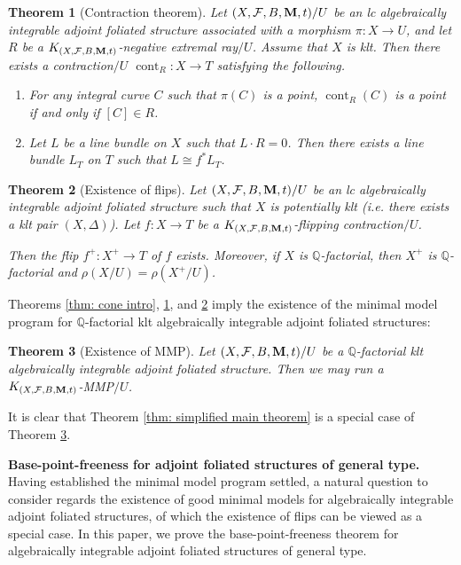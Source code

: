 \documentclass[12pt]{amsart}
\numberwithin{equation}{section}
\newcommand{\Mm}{{\bf{M}}}
\newcommand{\Qq}{\mathbb{Q}}
\newcommand{\cont}{\operatorname{cont}}
\newcommand{\Ff}{\mathcal{F}}
\newtheorem{thm}{Theorem}[section]
\theoremstyle{definition}
\theoremstyle{definition}
\theoremstyle{definition}
\begin{document}
\begin{thm}[Contraction theorem]\label{thm: cont intro}
Let $(X,\Ff,B,\Mm,t)/U$ be an lc algebraically integrable adjoint foliated structure associated with a morphism $\pi: X\rightarrow U$, and let $R$ be a $K_{(X,\Ff,B,\Mm,t)}$-negative extremal ray$/U$. Assume that $X$ is klt. Then there exists a contraction$/U$ $\cont_R: X\rightarrow T$ satisfying the following.
    \begin{enumerate}
        \item For any integral curve $C$ such that $\pi(C)$ is a point, $\cont_R(C)$ is a point if and only if $[C]\in R$.
        \item Let $L$ be a line bundle on $X$ such that $L\cdot R=0$. Then there exists a line bundle $L_T$ on $T$ such that $L\cong f^\ast L_T$.
    \end{enumerate}
\end{thm}


\begin{thm}[Existence of flips]\label{thm: eof intro}
 Let $(X,\Ff,B,\Mm,t)/U$ be an lc algebraically integrable adjoint foliated structure such that $X$ is potentially klt (i.e. there exists a klt pair $(X,\Delta)$). Let $f: X\rightarrow T$ be a $K_{(X,\Ff,B,\Mm,t)}$-flipping contraction$/U$. 
 
Then the flip $f^+ \colon X^+\rightarrow T$ of $f$ exists. Moreover, if $X$ is $\Qq$-factorial, then $X^+$ is $\Qq$-factorial and $\rho(X/U)=\rho(X^+/U)$. 
\end{thm}

Theorems \ref{thm: cone intro}, \ref{thm: cont intro}, and \ref{thm: eof intro} imply the existence of the minimal model program for $\Qq$-factorial klt algebraically integrable adjoint foliated structures:

\begin{thm}[Existence of MMP]\label{thm: can run mmp intro}
Let $(X,\Ff,B,\Mm,t)/U$ be a $\Qq$-factorial klt algebraically integrable adjoint foliated structure. Then we may run a $K_{(X,\Ff,B,\Mm,t)}$-MMP$/U$.
\end{thm}

It is clear that Theorem \ref{thm: simplified main theorem} is a special case of Theorem \ref{thm: can run mmp intro}.

\medskip

\noindent\textbf{Base-point-freeness for adjoint foliated structures of general type.} 
Having established the minimal model program settled, a natural question to consider regards the existence of good minimal models for algebraically integrable adjoint foliated structures, of which 
the existence of flips can be viewed as a special case. 
In this paper, we prove the base-point-freeness theorem for algebraically integrable adjoint foliated structures of general type.
\end{document}
